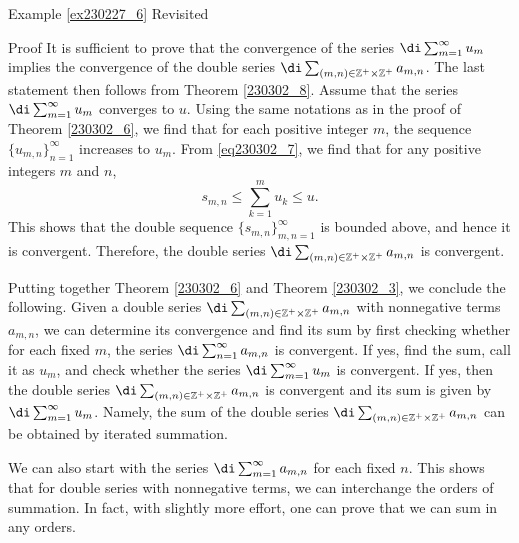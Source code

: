 \begin{example}{\linkt Example \ref{ex230227_6} Revisited}
\begin{example}[label=ex230227_13]{}
\begin{example}{}
\begin{example}[label=ex230301_6]{}
\begin{theorem}[label=230302_3]{}
\end{theorem}
\begin{myproof}{Proof}
It is sufficient to prove that the convergence of the series
$\di\sum_{m=1}^{\infty}u_m$ implies the convergence of the double series $\di\sum_{(m,n)\in\mathbb{Z}^+\times\mathbb{Z}^+}a_{m,n}$. The last statement then follows from Theorem \ref{230302_8}. Assume that the series
$\di\sum_{m=1}^{\infty}u_m$ converges to $u$. Using the same notations  as in the proof of Theorem \ref{230302_6}, we find 
that for each positive integer $m$, the sequence $\{u_{m,n}\}_{n=1}^{\infty}$ increases to $u_m$. From \eqref{eq230302_7}, we find  that for any positive integers $m$ and $n$, 
\[s_{m,n}\leq\sum_{k=1}^m u_k\leq u.\]This shows that the double sequence $\{s_{m,n}\}_{m,n=1}^{\infty}$ is bounded above, and hence it is convergent. Therefore,  the double series $\di\sum_{(m,n)\in\mathbb{Z}^+\times\mathbb{Z}^+}a_{m,n}$ is convergent. 

\end{myproof}
\begin{remark}{}
Putting together Theorem \ref{230302_6} and Theorem \ref{230302_3}, we conclude the following. Given a double series $\di\sum_{(m,n)\in\mathbb{Z}^+\times\mathbb{Z}^+}a_{m,n}$    with nonnegative terms $a_{m,n}$, we can determine its convergence and find its sum by first checking whether for each fixed $m$, the series $\di\sum_{n=1}^{\infty}a_{m,n}$ is convergent. If yes,  find the sum, call it as $u_m$, and check whether the series $\di\sum_{m=1}^{\infty}u_m$ is convergent. If yes, then the double series $\di\sum_{(m,n)\in\mathbb{Z}^+\times\mathbb{Z}^+}a_{m,n}$   is convergent and its sum is given by $\di\sum_{m=1}^{\infty}u_m$. Namely, the sum of the double series $\di\sum_{(m,n)\in\mathbb{Z}^+\times\mathbb{Z}^+}a_{m,n}$  can be obtained by iterated summation. \end{remark}
\begin{highlight}{} We can also start with the series $\di\sum_{m=1}^{\infty}a_{m,n}$ for each fixed $n$. This shows that for double series with nonnegative terms,   we can   interchange the orders of summation. In fact, with slightly more effort, one can prove that we can sum in any orders.


\end{highlight}
\end{example}
\end{example}
\end{example}
\end{example}
